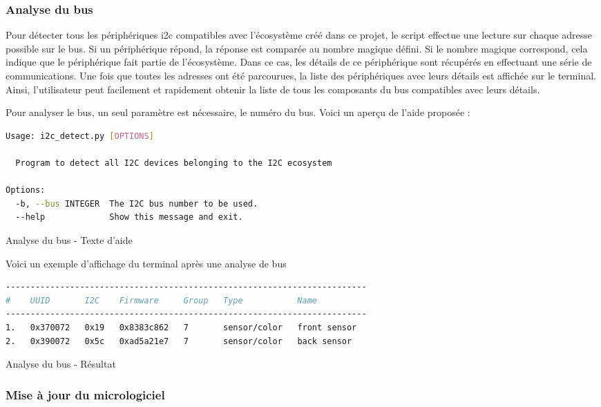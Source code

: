 \subsubsection{Analyse du bus}

Pour détecter tous les périphériques \gls{i2c} compatibles avec l'écosystème créé dans ce projet, le script effectue une lecture sur chaque adresse possible sur le bus.
Si un périphérique répond, la réponse est comparée au nombre magique défini.
Si le nombre magique correspond, cela indique que le périphérique fait partie de l'écosystème.
Dans ce cas, les détails de ce périphérique sont récupérés en effectuant une série de communications.
Une fois que toutes les adresses ont été parcourues, la liste des périphériques avec leurs détails est affichée sur le terminal.
Ainsi, l'utilisateur peut facilement et rapidement obtenir la liste de tous les composants du bus compatibles avec leurs détails.

Pour analyser le bus, un seul paramètre est nécessaire, le numéro du bus. Voici un aperçu de l'aide proposée :

\begin{listing}[!h]
    \begin{lstlisting}[language=bash]
Usage: i2c_detect.py [OPTIONS]

  Program to detect all I2C devices belonging to the I2C ecosystem

Options:
  -b, --bus INTEGER  The I2C bus number to be used.
  --help             Show this message and exit.
    \end{lstlisting}
    \caption{Analyse du bus - Texte d'aide}
\end{listing}

Voici un exemple d'affichage du terminal après une analyse de bus

\begin{listing}[!h]
    \begin{lstlisting}[language=bash]
-------------------------------------------------------------------------
#    UUID       I2C    Firmware     Group   Type           Name
-------------------------------------------------------------------------
1.   0x370072   0x19   0x8383c862   7       sensor/color   front sensor
2.   0x390072   0x5c   0xad5a21e7   7       sensor/color   back sensor
    \end{lstlisting}
    \caption{Analyse du bus - Résultat}
\end{listing}

\subsubsection{Mise à jour du micrologiciel}

